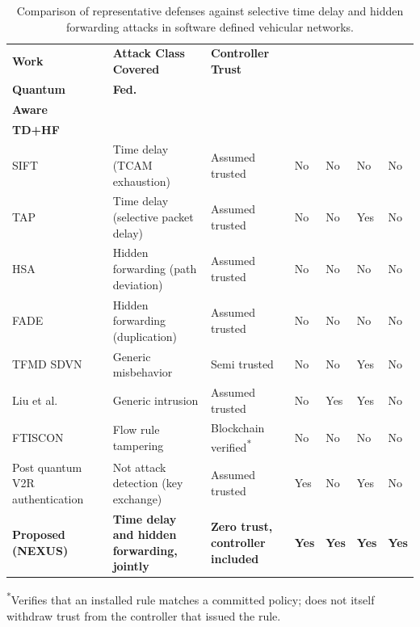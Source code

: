\documentclass[lettersize,journal]{IEEEtran}
\theoremstyle{plain}
\theoremstyle{remark}
\begin{document}
	\begin{table}[!t]
		\centering
		\caption{Comparison of representative defenses against selective time delay and hidden forwarding attacks in software defined vehicular networks.}
		\label{tab:related_work}
		\renewcommand{\arraystretch}{1.25}
		\footnotesize
		\begin{tabular}{|>{\raggedright\arraybackslash}p{2.0cm}|>{\raggedright\arraybackslash}p{3.1cm}|>{\raggedright\arraybackslash}p{2.6cm}|>{\centering\arraybackslash}p{1.0cm}|>{\centering\arraybackslash}p{1.3cm}|>{\centering\arraybackslash}p{1.6cm}|>{\centering\arraybackslash}p{1.7cm}|}
			\hline
			\textbf{Work} & \textbf{Attack Class Covered} & \textbf{Controller Trust} & \makecell{\textbf{Post}\\\textbf{Quantum}} & \textbf{Fed.} & \makecell{\textbf{Mobility}\\\textbf{Aware}} & \makecell{\textbf{Joint}\\\textbf{TD+HF}} \\
			\hline
			SIFT~\cite{Pascoal2017} & Time delay (TCAM exhaustion) & Assumed trusted & No & No & No & No \\
			\hline
			TAP~\cite{Arsalan2018} & Time delay (selective packet delay) & Assumed trusted & No & No & Yes & No \\
			\hline
			HSA~\cite{Mohammadi2016} & Hidden forwarding (path deviation) & Assumed trusted & No & No & No & No \\
			\hline
			FADE~\cite{Zhang2021FADE} & Hidden forwarding (duplication) & Assumed trusted & No & No & No & No \\
			\hline
			TFMD SDVN~\cite{Nayak2022} & Generic misbehavior & Semi trusted & No & No & Yes & No \\
			\hline
			Liu et al.~\cite{Liu2021BFLVEC} & Generic intrusion & Assumed trusted & No & Yes & Yes & No \\
			\hline
			FTISCON~\cite{Krishnan2023} & Flow rule tampering & Blockchain verified\textsuperscript{*} & No & No & No & No \\
			\hline
			Post quantum V2R authentication~\cite{ElDalahmeh2025} & Not attack detection (key exchange) & Assumed trusted & Yes & No & Yes & No \\
			\hline
			\textbf{Proposed (NEXUS)} & \textbf{Time delay and hidden forwarding, jointly} & \textbf{Zero trust, controller included} & \textbf{Yes} & \textbf{Yes} & \textbf{Yes} & \textbf{Yes} \\
			\hline
		\end{tabular}
		\vspace{2pt}
		\begin{flushleft}
			\footnotesize
			\textsuperscript{*}Verifies that an installed rule matches a committed policy; does not itself withdraw trust from the controller that issued the rule.
		\end{flushleft}
	\end{table}
	
\end{document}
